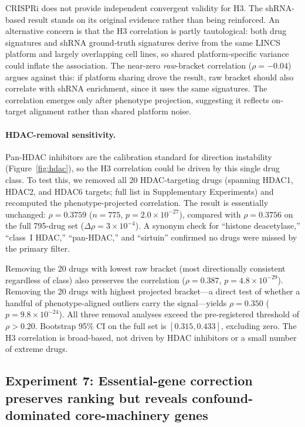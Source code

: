 \documentclass[11pt]{article}
\begin{document}
CRISPRi does not provide independent convergent validity for H3. The
shRNA-based result stands on its original evidence rather than being
reinforced. An alternative concern is that the H3 correlation is
partly tautological: both drug signatures and shRNA ground-truth
signatures derive from the same LINCS platform and largely overlapping
cell lines, so shared platform-specific variance could inflate the
association. The near-zero \emph{raw}-bracket correlation
($\rho = -0.04$) argues against this: if platform sharing drove the
result, raw bracket should also correlate with shRNA enrichment, since
it uses the same signatures. The correlation emerges only after
phenotype projection, suggesting it reflects on-target alignment
rather than shared platform noise.

\paragraph{HDAC-removal sensitivity.}
Pan-HDAC inhibitors are the calibration standard for direction instability
(Figure~\ref{fig:hdac}), so the H3 correlation could be driven by this
single drug class. To test this, we removed all 20 HDAC-targeting drugs
(spanning HDAC1, HDAC2, and HDAC6 targets; full list in Supplementary Experiments)
and recomputed the phenotype-projected correlation. The result is
essentially unchanged: $\rho = 0.3759$ ($n = 775$,
$p = 2.0 \times 10^{-27}$), compared with $\rho = 0.3756$ on the full
795-drug set ($\Delta\rho = 3 \times 10^{-4}$). A synonym check for ``histone
deacetylase,'' ``class~I HDAC,'' ``pan-HDAC,'' and ``sirtuin'' confirmed
no drugs were missed by the primary filter.

Removing the 20 drugs with lowest raw bracket (most directionally
consistent regardless of class) also preserves the correlation
($\rho = 0.387$, $p = 4.8 \times 10^{-29}$). Removing the 20 drugs with
highest projected bracket---a direct test of whether a handful of
phenotype-aligned outliers carry the signal---yields $\rho = 0.350$
($p = 9.8 \times 10^{-24}$). All three removal analyses exceed the
pre-registered threshold of $\rho > 0.20$. Bootstrap 95\% CI on the full
set is $[0.315, 0.433]$, excluding zero. The H3 correlation is broad-based,
not driven by HDAC inhibitors or a small number of extreme drugs.

\subsection{Experiment 7: Essential-gene correction preserves ranking
but reveals confound-dominated core-machinery genes}
\end{document}

